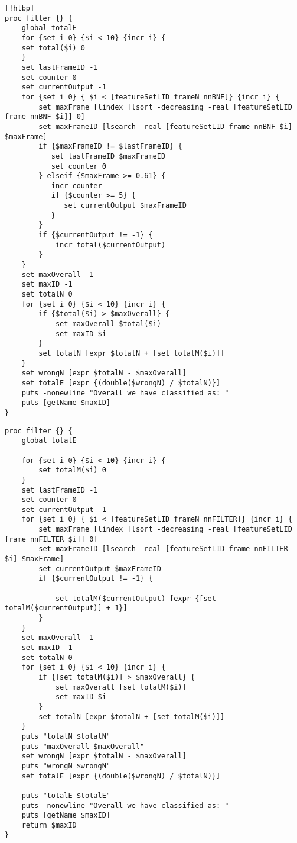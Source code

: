 \begin{lstlisting}[label=lst:BasicFilter,caption=Basic (first try) Filter employed to smooth/improve output][!htbp]
proc filter {} {
    global totalE
    for {set i 0} {$i < 10} {incr i} {
    set total($i) 0
    }
    set lastFrameID -1
    set counter 0
    set currentOutput -1
    for {set i 0} { $i < [featureSetLID frameN nnBNF]} {incr i} {
        set maxFrame [lindex [lsort -decreasing -real [featureSetLID frame nnBNF $i]] 0]
        set maxFrameID [lsearch -real [featureSetLID frame nnBNF $i] $maxFrame]
        if {$maxFrameID != $lastFrameID} {
           set lastFrameID $maxFrameID
           set counter 0
        } elseif {$maxFrame >= 0.61} {
           incr counter
           if {$counter >= 5} {
              set currentOutput $maxFrameID
           }
        }
        if {$currentOutput != -1} {
            incr total($currentOutput)
        }
    }
    set maxOverall -1
    set maxID -1
    set totalN 0
    for {set i 0} {$i < 10} {incr i} {
        if {$total($i) > $maxOverall} {
            set maxOverall $total($i)
            set maxID $i
        }
        set totalN [expr $totalN + [set totalM($i)]]
    }
    set wrongN [expr $totalN - $maxOverall]
    set totalE [expr {(double($wrongN) / $totalN)}]
    puts -nonewline "Overall we have classified as: "
    puts [getName $maxID]
}
\end{lstlisting}
\newpage
\begin{lstlisting}[label=lst:AdvancedFilter,caption=Advanced FILTER employed to smooth/improve output]
proc filter {} {
    global totalE

    for {set i 0} {$i < 10} {incr i} {
        set totalM($i) 0
    }
    set lastFrameID -1
    set counter 0
    set currentOutput -1
    for {set i 0} { $i < [featureSetLID frameN nnFILTER]} {incr i} {
        set maxFrame [lindex [lsort -decreasing -real [featureSetLID frame nnFILTER $i]] 0]
        set maxFrameID [lsearch -real [featureSetLID frame nnFILTER $i] $maxFrame]
        set currentOutput $maxFrameID
        if {$currentOutput != -1} {

            set totalM($currentOutput) [expr {[set totalM($currentOutput)] + 1}]
        }
    }
    set maxOverall -1
    set maxID -1
    set totalN 0
    for {set i 0} {$i < 10} {incr i} {
        if {[set totalM($i)] > $maxOverall} {
            set maxOverall [set totalM($i)]
            set maxID $i
        }
        set totalN [expr $totalN + [set totalM($i)]]
    }
    puts "totalN $totalN"
    puts "maxOverall $maxOverall"
    set wrongN [expr $totalN - $maxOverall]
    puts "wrongN $wrongN"
    set totalE [expr {(double($wrongN) / $totalN)}]

    puts "totalE $totalE"
    puts -nonewline "Overall we have classified as: "
    puts [getName $maxID]
    return $maxID
}
\end{lstlisting}
